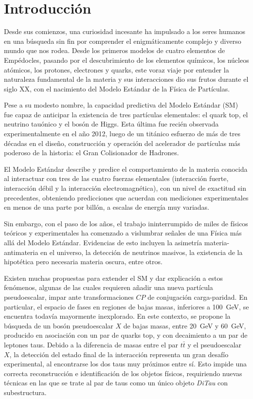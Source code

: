 \chapter*{Introducción}

Desde sus comienzos, una curiosidad incesante ha impulsado a los seres humanos en una búsqueda sin fin por comprender el enigmáticamente complejo y diverso mundo que nos rodea. Desde los primeros modelos de cuatro elementos de Empédocles, pasando por el descubrimiento de los elementos químicos, los núcleos atómicos, los protones, electrones y quarks, este voraz viaje por entender la naturaleza fundamental de la materia y sus interacciones dio sus frutos durante el siglo XX, con el nacimiento del Modelo Estándar de la Física de Partículas.

Pese a su modesto nombre, la capacidad predictiva del Modelo Estándar (SM) fue capaz de anticipar la existencia de tres partículas elementales: el quark top, el neutrino tauónico y el bosón de Higgs. Esta última fue recién observada experimentalmente en el año 2012, luego de un titánico esfuerzo de más de tres décadas en el diseño, construcción y operación del acelerador de partículas más poderoso de la historia: el Gran Colisionador de Hadrones.

El Modelo Estándar describe y predice el comportamiento de la materia conocida al interactuar con tres de las cuatro fuerzas elementales (interacción fuerte, interacción débil y la interacción electromagnética), con un nivel de exactitud sin precedentes, obteniendo predicciones que acuerdan con mediciones experimentales en menos de una parte por billón, a escalas de energía muy variadas.

Sin embargo, con el paso de los años, el trabajo ininterrumpido de miles de físicos teóricos y experimentales ha comenzado a vislumbrar señales de una Física más allá del Modelo Estándar. Evidencias de esto incluyen la asimetría materia-antimateria en el universo, la detección de neutrinos masivos, la existencia de la hipotética pero necesaria materia oscura, entre otros.

Existen muchas propuestas para extender el SM y dar explicación a estos fenómenos, algunas de las cuales requieren añadir una nueva partícula pseudoescalar, impar ante transformaciones $CP$ de conjugación carga-paridad. En particular, el espacio de fases en regiones de bajas masas, inferiores a \SI{100}{\GeV}, se encuentra todavía mayormente inexplorado. En este contexto, se propone la búsqueda de un bosón pseudoescalar $X$ de bajas masas, entre \SI{20}{\GeV} y \SI{60}{\GeV}, producido en asociación con un par de quarks top, y con decaimiento a un par de leptones taus. Debido a la diferencia de masas entre el par $t\bar{t}$ y el pseudoescalar $X$, la detección del estado final de la interacción representa un gran desafío experimental, al encontrarse los dos taus muy próximos entre sí. Esto impide una correcta reconstrucción e identificación de los objetos físicos, requiriendo nuevas técnicas en las que se trate al par de taus como un único objeto \textit{DiTau} con subestructura.

